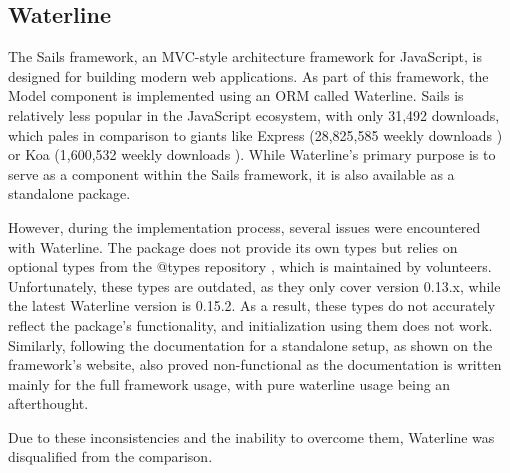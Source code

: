 \subsection{Waterline}

The Sails framework, an MVC-style architecture framework for JavaScript, is
designed for building modern web applications. As part of this framework, the
Model component is implemented using an ORM called Waterline. Sails is
relatively less popular in the JavaScript ecosystem, with only 31,492 downloads,
which pales in comparison to giants like Express (28,825,585 weekly downloads
\cite{express_2022}) or Koa (1,600,532 weekly downloads \cite{koa_2023}). While Waterline's
primary purpose is to serve as a component within the Sails framework, it is
also available as a standalone package.

However, during the implementation process, several issues were encountered with
Waterline. The package does not provide its own types but relies on optional
types from the @types repository \cite{definitelytyped/types/waterline}, which
is maintained by volunteers. Unfortunately, these types are outdated, as they
only cover version 0.13.x, while the latest Waterline version is 0.15.2. As a
result, these types do not accurately reflect the package's functionality, and
initialization using them does not work. Similarly, following the documentation
for a standalone setup, as shown on the framework's website, also proved
non-functional as the documentation \cite{waterline-docs} is written mainly for
the full framework usage, with pure waterline usage being an afterthought.

Due to these inconsistencies and the inability to overcome them, Waterline was
disqualified from the comparison.